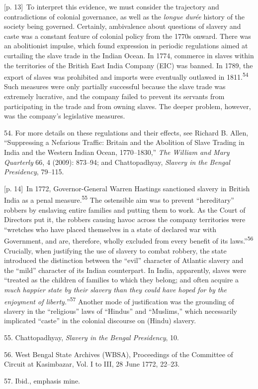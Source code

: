 \documentclass[10pt,a4paper]{article}
\begin{document}
{\scriptsize\color{gray} [p. 13]}\ To interpret this evidence, we must consider the trajectory and contradictions of colonial governance, as well as the \textit{longue durée} history of the society being governed. Certainly, ambivalence about questions of slavery and caste was a constant feature of colonial policy from the 1770s onward. There was an abolitionist impulse, which found expression in periodic regulations aimed at curtailing the slave trade in the Indian Ocean. In 1774, commerce in slaves within the territories of the British East India Company (EIC) was banned. In 1789, the export of slaves was prohibited and imports were eventually outlawed in 1811.\nobreak\textsuperscript{54} Such measures were only partially successful because the slave trade was extremely lucrative, and the company failed to prevent its servants from participating in the trade and from owning slaves. The deeper problem, however, was the company’s legislative measures.\par{\small 54. For more details on these regulations and their effects, see Richard B. Allen, “Suppressing a Nefarious Traffic: Britain and the Abolition of Slave Trading in India and the Western Indian Ocean, 1770–1830,” \textit{The William and Mary Quarterly} 66, 4 (2009): 873–94; and Chattopadhyay, \textit{Slavery in the Bengal Presidency}, 79–115.\par}
{\scriptsize\color{gray} [p. 14]}\ In 1772, Governor-General Warren Hastings sanctioned slavery in British India as a penal measure.\nobreak\textsuperscript{55} The ostensible aim was to prevent “hereditary” robbers by enslaving entire families and putting them to work. As the Court of Directors put it, the robbers causing havoc across the company territories were “wretches who have placed themselves in a state of declared war with Government, and are, therefore, wholly excluded from every benefit of its laws.”\nobreak\textsuperscript{56} Crucially, when justifying the use of slavery to combat robbery, the state introduced the distinction between the “evil” character of Atlantic slavery and the “mild” character of its Indian counterpart. In India, apparently, slaves were “treated as the children of families to which they belong; and often acquire a \textit{much happier state by their slavery than they could have hoped for by the enjoyment of liberty.}”\nobreak\textsuperscript{57} Another mode of justification was the grounding of slavery in the “religious” laws of “Hindus” and “Muslims,” which necessarily implicated “caste” in the colonial discourse on (Hindu) slavery.\par{\small 55. Chattopadhyay, \textit{Slavery in the Bengal Presidency}, 10.\par}{\small 56. West Bengal State Archives (WBSA), Proceedings of the Committee of Circuit at Kasimbazar, Vol. I to III, 28 June 1772, 22–23.\par}{\small 57. Ibid., emphasis mine.\par}
\end{document}
